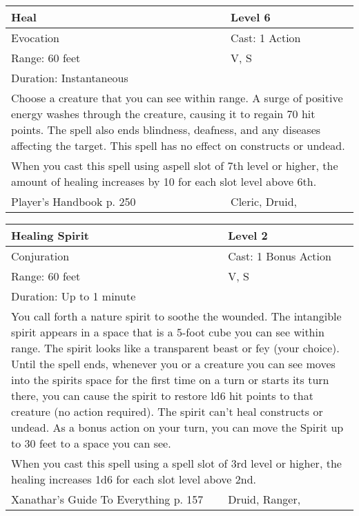 \documentclass[11pt]{report}
\begin{document}
\begin{table}[H]
	\begin{tabular}{||p{6cm}|p{6cm}||}
		\hline\hline
		\bf{Heal} & Level 6\\ \hline
		Evocation & Cast: 1 Action\\ \hline
		Range: 60 feet & V, S\\ \hline
		Duration: Instantaneous & \\ \hline
		\multicolumn{2}{||p{12cm}||}{Choose a creature that you can see within range. A surge of positive energy washes through the creature, causing it to regain 70 hit points. The spell also ends blindness, deafness, and any diseases affecting the target. This spell has no effect on constructs or undead.}\\ \hline
		\multicolumn{2}{||p{12cm}||}{When you cast this spell using aspell slot of 7th level or higher, the amount of healing increases by 10 for each slot level above 6th.}\\ \hline
Player's Handbook p. 250 & Cleric, Druid, \\ \hline\hline
	\end{tabular}
\end{table}

\begin{table}[H]
	\begin{tabular}{||p{6cm}|p{6cm}||}
		\hline\hline
		\bf{Healing Spirit} & Level 2\\ \hline
		Conjuration & Cast: 1 Bonus Action\\ \hline
		Range: 60 feet & V, S\\ \hline
		Duration: Up to 1 minute & \\ \hline
		\multicolumn{2}{||p{12cm}||}{You call forth a nature spirit to soothe the wounded. The intangible spirit appears in a space that is a 5-foot cube you can see within range. The spirit looks like a transparent beast or fey (your choice). Until the spell ends, whenever you or a creature you can see moves into the spirits space for the first time on a turn or starts its turn there, you can cause the spirit to restore ld6 hit points to that creature (no action required). The spirit can’t heal constructs or undead. As a bonus action on your turn, you can move the Spirit up to 30 feet to a space you can see.}\\ \hline
		\multicolumn{2}{||p{12cm}||}{When you cast this spell using a spell slot of 3rd level or higher, the healing increases 1d6 for each slot level above 2nd.}\\ \hline
Xanathar's Guide To Everything p. 157 & Druid, Ranger, \\ \hline\hline
	\end{tabular}
\end{table}
\end{document}
